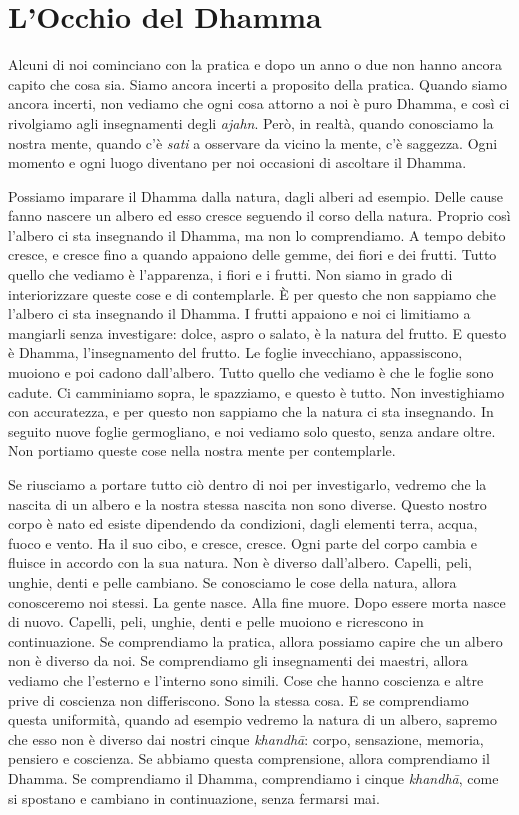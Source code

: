 \chapter{L'Occhio del Dhamma}

Alcuni di noi cominciano con la pratica e dopo un anno o due non hanno
ancora capito che cosa sia. Siamo ancora incerti a proposito della
pratica. Quando siamo ancora incerti, non vediamo che ogni cosa attorno
a noi è puro Dhamma, e così ci rivolgiamo agli insegnamenti degli
\emph{ajahn}. Però, in realtà, quando conosciamo la nostra mente, quando
c'è \emph{sati} a osservare da vicino la mente, c'è saggezza. Ogni
momento e ogni luogo diventano per noi occasioni di ascoltare il Dhamma.

Possiamo imparare il Dhamma dalla natura, dagli alberi ad esempio. Delle
cause fanno nascere un albero ed esso cresce seguendo il corso della
natura. Proprio così l'albero ci sta insegnando il Dhamma, ma non lo
comprendiamo. A tempo debito cresce, e cresce fino a quando appaiono
delle gemme, dei fiori e dei frutti. Tutto quello che vediamo è
l'apparenza, i fiori e i frutti. Non siamo in grado di interiorizzare
queste cose e di contemplarle. È per questo che non sappiamo che
l'albero ci sta insegnando il Dhamma. I frutti appaiono e noi ci
limitiamo a mangiarli senza investigare: dolce, aspro o salato, è la
natura del frutto. E questo è Dhamma, l'insegnamento del frutto. Le
foglie invecchiano, appassiscono, muoiono e poi cadono dall'albero.
Tutto quello che vediamo è che le foglie sono cadute. Ci camminiamo
sopra, le spazziamo, e questo è tutto. Non investighiamo con
accuratezza, e per questo non sappiamo che la natura ci sta insegnando.
In seguito nuove foglie germogliano, e noi vediamo solo questo, senza
andare oltre. Non portiamo queste cose nella nostra mente per
contemplarle.

Se riusciamo a portare tutto ciò dentro di noi per investigarlo, vedremo
che la nascita di un albero e la nostra stessa nascita non sono diverse.
Questo nostro corpo è nato ed esiste dipendendo da condizioni, dagli
elementi terra, acqua, fuoco e vento. Ha il suo cibo, e cresce, cresce.
Ogni parte del corpo cambia e fluisce in accordo con la sua natura. Non
è diverso dall'albero. Capelli, peli, unghie, denti e pelle cambiano. Se
conosciamo le cose della natura, allora conosceremo noi stessi. La gente
nasce. Alla fine muore. Dopo essere morta nasce di nuovo. Capelli, peli,
unghie, denti e pelle muoiono e ricrescono in continuazione. Se
comprendiamo la pratica, allora possiamo capire che un albero non è
diverso da noi. Se comprendiamo gli insegnamenti dei maestri, allora
vediamo che l'esterno e l'interno sono simili. Cose che hanno coscienza
e altre prive di coscienza non differiscono. Sono la stessa cosa. E se
comprendiamo questa uniformità, quando ad esempio vedremo la natura di
un albero, sapremo che esso non è diverso dai nostri cinque
\emph{khandhā}: corpo, sensazione, memoria, pensiero e coscienza. Se
abbiamo questa comprensione, allora comprendiamo il Dhamma. Se
comprendiamo il Dhamma, comprendiamo i cinque \emph{khandhā}, come si
spostano e cambiano in continuazione, senza fermarsi mai.


